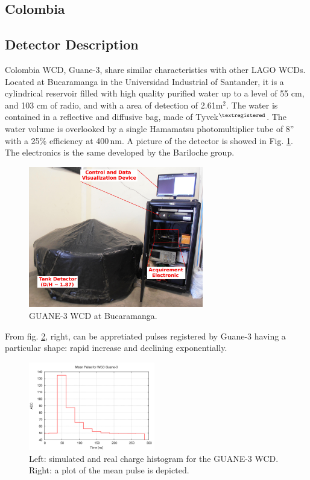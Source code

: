 \subsection{Colombia}\label{subsec:col}

\subsection*{Detector Description}

Colombia WCD, Guane-3, share similar characteristics with other LAGO WCDs.
Located at Bucaramanga in the Universidad Industrial of Santander, it is a
cylindrical reservoir filled with high quality purified water up to a level of
55 cm, and 103 cm of radio, and with a area of detection of 2.61m$^2$. The
water is contained in a reflective and diffusive bag, made of
Tyvek$^{\textregistered}$. The water volume is overlooked by a single Hamamatsu
photomultiplier tube of 8'' with a 25\% efficiency at 400\,nm. A picture of the
detector is showed in Fig. \ref{fig:Guane3WCD}. The electronics is the same
developed by the Bariloche group. 

\begin{figure}[h!]
\begin{center}
\includegraphics[width=3in]{images/colombia/WCD-Guane3.jpg}
\caption{GUANE-3 WCD at Bucaramanga.}
\label{fig:Guane3WCD}
\end{center}
\end{figure}

From fig. \ref{fig:results-col}, right, can be appretiated pulses registered by
Guane-3 having a particular shape: rapid increase and declining exponentially.

\begin{figure}
\centering
\includegraphics[width=0.49\textwidth]{images/colombia/MeanPulse-Guane3.png} 
\caption{Left: simulated and real charge histogram for the GUANE-3 WCD. Right: a plot of the mean pulse is depicted.} 
\label{fig:results-col}
\end{figure}

